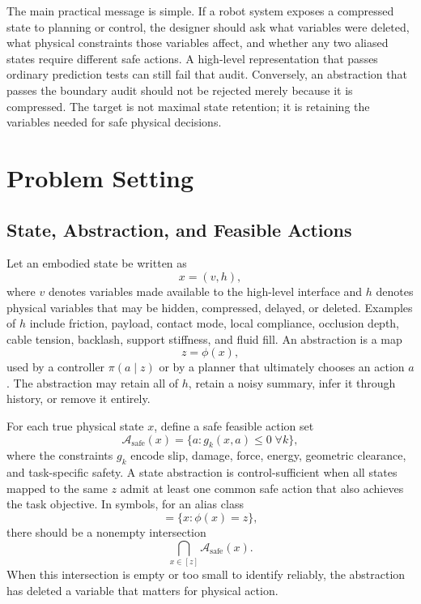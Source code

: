 \documentclass{article}
\begin{document}
The main practical message is simple. If a robot system exposes a compressed state
to planning or control, the designer should ask what variables were deleted, what
physical constraints those variables affect, and whether any two aliased states
require different safe actions. A high-level representation that passes ordinary
prediction tests can still fail that audit. Conversely, an abstraction that passes
the boundary audit should not be rejected merely because it is compressed. The
target is not maximal state retention; it is retaining the variables needed for
safe physical decisions.

\section{Problem Setting}

\subsection{State, Abstraction, and Feasible Actions}

Let an embodied state be written as
\begin{equation}
    x = (v, h),
\end{equation}
where $v$ denotes variables made available to the high-level interface and $h$
denotes physical variables that may be hidden, compressed, delayed, or deleted.
Examples of $h$ include friction, payload, contact mode, local compliance,
occlusion depth, cable tension, backlash, support stiffness, and fluid fill. An
abstraction is a map
\begin{equation}
    z = \phi(x),
\end{equation}
used by a controller $\pi(a \mid z)$ or by a planner that ultimately chooses an
action $a$. The abstraction may retain all of $h$, retain a noisy summary, infer
it through history, or remove it entirely.

For each true physical state $x$, define a safe feasible action set
\begin{equation}
    \mathcal{A}_{\mathrm{safe}}(x) =
    \{a : g_k(x,a) \leq 0 \; \forall k\},
\end{equation}
where the constraints $g_k$ encode slip, damage, force, energy, geometric
clearance, and task-specific safety. A state abstraction is control-sufficient
when all states mapped to the same $z$ admit at least one common safe action that
also achieves the task objective. In symbols, for an alias class
\begin{equation}
    [z] = \{x : \phi(x) = z\},
\end{equation}
there should be a nonempty intersection
\begin{equation}
    \bigcap_{x \in [z]} \mathcal{A}_{\mathrm{safe}}(x).
\end{equation}
When this intersection is empty or too small to identify reliably, the abstraction
has deleted a variable that matters for physical action.
\end{document}
